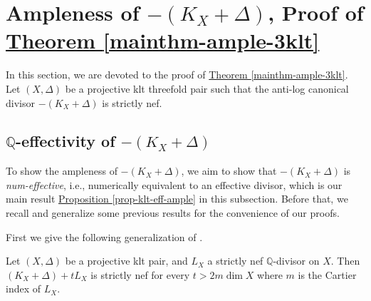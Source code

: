 \section{Ampleness of \texorpdfstring{$-(K_X+\Delta)$}{text}, Proof of \texorpdfstring{{\hyperref[mainthm-ample-3klt]{Theorem \ref*{mainthm-ample-3klt}}}}{text}}\label{section-pf-thmc}

In this section, we are devoted to the proof of  \texorpdfstring{{\hyperref[mainthm-ample-3klt]{Theorem \ref*{mainthm-ample-3klt}}}}{text}.
Let $(X,\Delta)$ be a projective klt threefold pair such that the anti-log canonical divisor $-(K_X+\Delta)$ is strictly nef.
 
\subsection{\texorpdfstring{$\mathbb{Q}$}{text}-effectivity of \texorpdfstring{$-(K_X+\Delta)$}{text}}
To show the ampleness of $-(K_X+\Delta)$, we aim to show that $-(K_X+\Delta)$ is \textit{num-effective}, i.e., numerically equivalent to an effective divisor, which is our main result  {\hyperref[prop-klt-eff-ample]{Proposition \ref*{prop-klt-eff-ample}}} in this subsection.
Before that, we recall and generalize some previous results for the convenience of our proofs.

First we give the following generalization of \cite[Lemma 1.1]{Ser95}.

\begin{lemme}\label{lem_strict_nef_k}
Let $(X,\Delta)$ be a projective klt pair, and $L_X$  a strictly nef $\mathbb{Q}$-divisor on $X$.
Then $(K_X+\Delta)+tL_X$ is  strictly nef for every $t>2m\dim X$ where $m$ is the Cartier index of $L_X$.
\end{lemme}



